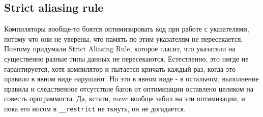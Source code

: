 \documentclass[15pt, a4paper]{article}
\begin{document}
\subsection{Strict aliasing rule}
Компиляторы вообще-то боятся оптимизировать код при работе с указателями, потому что они не уверены, что память по этим указателям не пересекается.
Поэтому придумали Strict Aliasing Rule, которое гласит, что указатели на существенно разные типы данных не пересекаются.
Естественно, это нигде не гарантируется, хотя компилятор и пытается кричать каждый раз, когда это правило в явном виде нарушают.
Но это в явном виде - в остальном, выполнение правила и следственное отсутствие багов от оптимизации оставлено целиком на совесть программиста.
Да, кстати, msvc вообще забил на эти оптимизации, и пока его носом в \texttt{\_\_restrict} не ткнуть, он не догадается. 
\end{document}

